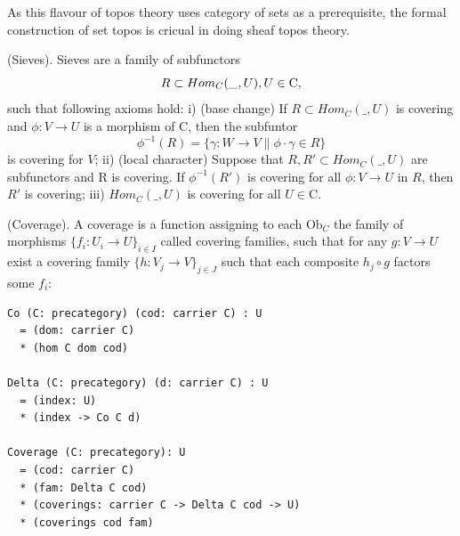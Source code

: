 As this flavour of topos theory uses category of sets as a prerequisite,
the formal construction of set topos is cricual in doing sheaf topos theory.

\begin{definition} (Sieves).
Sieves are a family of subfunctors
$$\def\mapright#1{\xrightarrow{{#1}}}
  \def\mapdown#1{\Big\downarrow\rlap{\raise2pt{\scriptstyle{#1}}}}
  \def\mapdiagl#1{\vcenter{\searrow}\rlap{\raise2pt{\scriptstyle{#1}}}}
  \def\mapdiagr#1{\vcenter{\swarrow}\rlap{\raise2pt{\scriptstyle{#1}}}}
  R \subset Hom_C(\_,U), U \in \mathrm{C},
$$
such that following axioms hold: i) (base change) If $R \subset Hom_C(\_,U)$ is covering
and $\phi : V \rightarrow U$ is a morphism of $\mathrm{C}$, then the subfuntor
$$
   \phi^{-1}(R) = \{ \gamma : W \rightarrow V \| \phi \cdot \gamma \in R \}
$$
is covering for $V$; ii) (local character) Suppose that $R,R' \subset Hom_C(\_,U)$ are
subfunctors and R is covering. If $\phi^{-1}(R')$ is covering for
all $\phi : V \rightarrow U$ in $R$, then $R'$ is covering; iii)
$Hom_C(\_,U)$ is covering for all $U \in \mathrm{C}$.
\end{definition}

\begin{definition} (Coverage).
A coverage is a function assigning
to each $\mathrm{Ob}_C$ the family of morphisms $\{f_i : U_i \rightarrow U \}_{i\in I}$ called
covering families, such that for any $g: V \rightarrow U$ exist
a covering family $\{h:V_j \rightarrow V\}_{j \in J}$ such that
each composite $h_j \circ g$ factors some $f_i$:
\begin{lstlisting}
Co (C: precategory) (cod: carrier C) : U
  = (dom: carrier C)
  * (hom C dom cod)

Delta (C: precategory) (d: carrier C) : U
  = (index: U)
  * (index -> Co C d)

Coverage (C: precategory): U
  = (cod: carrier C)
  * (fam: Delta C cod)
  * (coverings: carrier C -> Delta C cod -> U)
  * (coverings cod fam)
\end{lstlisting}
\end{definition}

